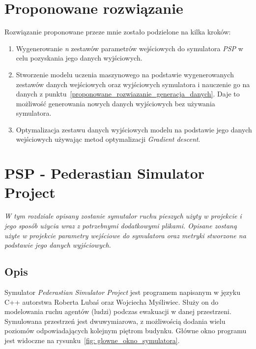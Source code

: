 \documentclass[12pt]{aghdpl}
\begin{document}
	\chapter{Proponowane rozwiązanie}
	Rozwiązanie proponowane przeze mnie zostało podzielone na kilka kroków:
	\begin{enumerate}
	\item\label{proponowane_rozwiazanie_generacja_danych} Wygenerowanie \textit{n} zestawów parametrów wejściowych do symulatora \textit{PSP} w celu pozyskania jego danych wyjściowych.
	\item Stworzenie modelu uczenia maszynowego na podstawie wygenerowanych zestawów danych wejściowych oraz wyjściowych symulatora i nauczenie go na danych z punktu~\ref{proponowane_rozwiazanie_generacja_danych}. Daje to możliwość generowania nowych danych wyjściowych bez używania symulatora.
	\item Optymalizacja zestawu danych wyjściowych modelu na podstawie jego danych wejściowych używając metod optymalizacji \textit{Gradient descent}.
	\end{enumerate}
	
	\chapter{PSP - Pederastian Simulator Project} \label{sekcja_psp}
	\textit{W tym rozdziale opisany zostanie symutalor ruchu pieszych użyty w projekcie i jego sposób użycia wraz z potrzebnymi dodatkowymi plikami. Opisane zostaną użyte w projekcie parametry wejściowe do symulatora oraz metryki stworzone na podstawie jego danych wyjściowych.}
	
		\section{Opis}
		Symulator \textit{Pederastian Simulator Project} jest programem napisanym w języku C++ autorstwa Roberta Lubaś oraz Wojciecha Myśliwiec. Służy on do modelowania ruchu agentów (ludzi) podczas ewakuacji w danej przestrzeni. Symulowana przestrzeń jest dwuwymiarowa, z możliwością dodania wielu poziomów odpowiadających kolejnym piętrom budynku. Główne okno programu jest widoczne na rysunku~\ref{fig: glowne_okno_symulatora}.
	
\end{document}
